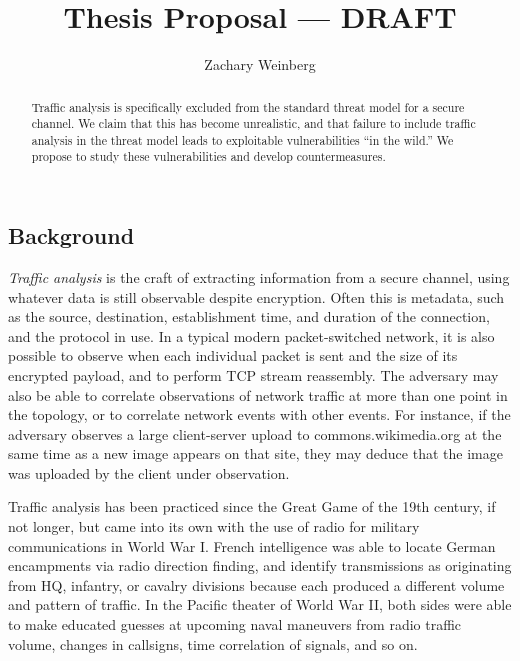 \documentclass[oneside]{zarticle}
\begin{document}
\title{Thesis Proposal --- DRAFT}
\author{Zachary Weinberg}
\maketitle

\begin{multicols}{2}

\begin{abstract}
Traffic analysis is specifically excluded from the standard threat
model for a secure channel.  We claim that this has become
unrealistic, and that failure to include traffic analysis in the
threat model leads to exploitable vulnerabilities “in the wild.”  We
propose to study these vulnerabilities and develop countermeasures.
\end{abstract}

\section{Background}

\emph{Traffic analysis} is the craft of extracting information from a
secure channel, using whatever data is still observable despite
encryption. Often this is metadata, such as the source, destination,
establishment time, and duration of the connection, and the protocol
in use.  In a typical modern packet-switched network, it is also
possible to observe when each individual packet is sent and the size
of its encrypted payload, and to perform TCP stream reassembly.  The
adversary may also be able to correlate observations of network
traffic at more than one point in the topology, or to correlate
network events with other events.  For instance, if the adversary
observes a large client-server upload to
\textsf{commons.wikimedia.org} at the same time as a new image appears
on that site, they may deduce that the image was uploaded by the
client under observation.

Traffic analysis has been practiced since the Great Game of the 19th
century, if not longer, but came into its own with the use of radio
for military communications in World War I.  French intelligence was
able to locate German encampments via radio direction finding, and
identify transmissions as originating from HQ, infantry, or cavalry
divisions because each produced a different volume and pattern of
traffic.  In the Pacific theater of World War II, both sides were able
to make educated guesses at upcoming naval maneuvers from radio
traffic volume, changes in callsigns, time correlation of signals, and
so on.~\cite{kahn1967codebreakers}


\end{multicols}
\end{document}
